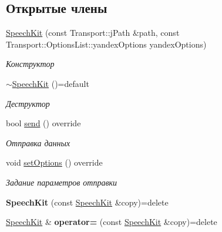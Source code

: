 \subsection*{Открытые члены}
\begin{DoxyCompactItemize}
\item 
\hyperlink{classJarvis_1_1connection_1_1SpeechKit_a814a5553551a585b66a7e72c99b3522f}{Speech\+Kit} (const Transport\+::j\+Path \&path, const Transport\+::\+Options\+List\+::yandex\+Options yandex\+Options)
\begin{DoxyCompactList}\small\item\em Конструктор \end{DoxyCompactList}\item 
\mbox{\label{classJarvis_1_1connection_1_1SpeechKit_ae84ee36952ac6a4f2dfb9285d08ab4f6}} 
\hyperlink{classJarvis_1_1connection_1_1SpeechKit_ae84ee36952ac6a4f2dfb9285d08ab4f6}{$\sim$\+Speech\+Kit} ()=default
\begin{DoxyCompactList}\small\item\em Деструктор \end{DoxyCompactList}\item 
bool \hyperlink{classJarvis_1_1connection_1_1SpeechKit_af213e0c8c3f6bb8a1776f6f21c859713}{send} () override
\begin{DoxyCompactList}\small\item\em Отправка данных \end{DoxyCompactList}\item 
\mbox{\label{classJarvis_1_1connection_1_1SpeechKit_a84d5ffcc555d07c4360bdbfaf3eb67c1}} 
void \hyperlink{classJarvis_1_1connection_1_1SpeechKit_a84d5ffcc555d07c4360bdbfaf3eb67c1}{set\+Options} () override
\begin{DoxyCompactList}\small\item\em Задание параметров отправки \end{DoxyCompactList}\item 
\mbox{\label{classJarvis_1_1connection_1_1SpeechKit_a198b1b71454117a14939aa714e1a7d3e}} 
{\bfseries Speech\+Kit} (const \hyperlink{classJarvis_1_1connection_1_1SpeechKit}{Speech\+Kit} \&copy)=delete
\item 
\mbox{\label{classJarvis_1_1connection_1_1SpeechKit_ad9e08c9e8cc41e40c60f61f26c7b69d6}} 
\hyperlink{classJarvis_1_1connection_1_1SpeechKit}{Speech\+Kit} \& {\bfseries operator=} (const \hyperlink{classJarvis_1_1connection_1_1SpeechKit}{Speech\+Kit} \&copy)=delete
\end{DoxyCompactItemize}
